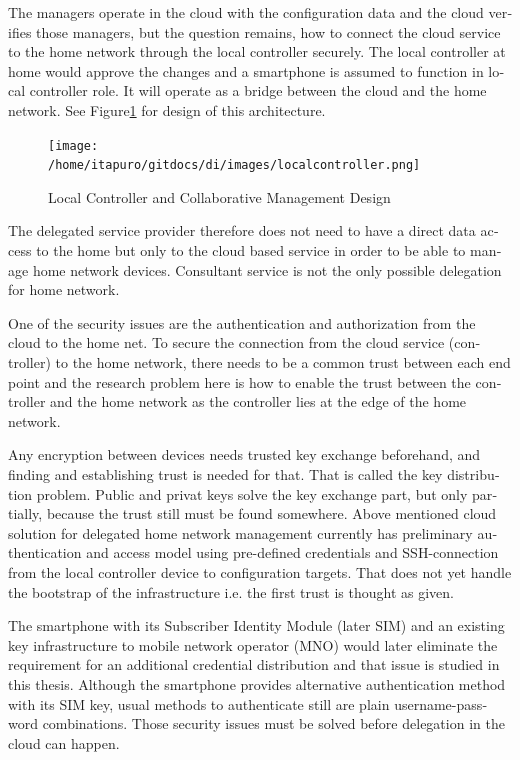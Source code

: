 \documentclass[12pt,a4paper,english]{tutthesis}
\begin{document}
\begin{otherlanguage}{english}
The managers operate in the cloud with the configuration data and the
cloud verifies those managers,
but the question remains, how to connect the cloud service to the home network
through the local controller securely. The local controller at home
would approve the changes and a smartphone is assumed to function in
local controller role. It will operate as a bridge between the cloud and the home network.
See Figure\ref{fig:localcontroller} for design of this architecture.

\begin{figure}[htb]
\centering
\texttt{[image: /home/itapuro/gitdocs/di/images/localcontroller.png]}
\caption{\label{fig:localcontroller}Local Controller and Collaborative Management Design}
\end{figure}


The delegated service provider therefore does not need to have a direct data
access to the home but only to the cloud based service in order to be able to
manage home network devices.
Consultant service is not the only possible delegation for home network.








One of the security issues are the authentication and authorization 
from the cloud to the home net.
To secure the connection from the cloud service (controller)
to the home network, there needs to be a common trust between each end
point and the research problem here is how to enable the trust between the
controller and the home network as the controller lies at the edge of the
home network.


Any encryption between devices needs trusted key exchange beforehand,
and finding and establishing trust is needed for that.  That is called
the key distribution problem. Public and privat keys solve the key exchange part, but
only partially, because the trust still must be found somewhere.
Above mentioned cloud solution for delegated home network
management currently has preliminary authentication and access model
using pre-defined credentials and SSH-connection from the local
controller device to configuration
targets\cite[Chap.4]{silverajan2015collaborative}.
That does not yet handle the bootstrap of the infrastructure
i.e. the first trust is thought as given. 

The smartphone with its Subscriber Identity Module (later SIM) and an existing key infrastructure to mobile
network operator (MNO) would later eliminate the requirement for an
additional credential distribution and that issue is studied in this
thesis.  Although the smartphone provides alternative authentication
method with its SIM key, usual methods to authenticate still are plain
username-password combinations.  Those security issues must be solved
before delegation in the cloud can happen.




\end{otherlanguage}
\end{document}
